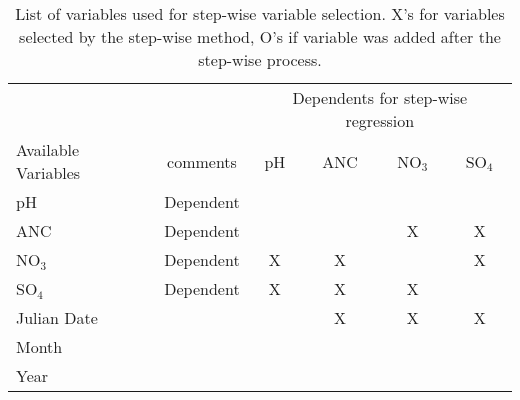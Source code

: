 \begin{table}[htbp]
\caption{List of variables used for step-wise variable selection.  X's for variables selected by the step-wise method, O's if variable was added after the step-wise process.}
\begin{tabular}{lccccc}
\toprule
                                      &                    & \multicolumn{ 4}{c}{Dependents for step-wise regression}                                                                                                                                               \\ \cline{3-6}\noalign{\smallskip}
Available Variables         & comments  & \multicolumn{1}{p{1.2cm}}{pH} &\multicolumn{1}{p{1.2cm}}{ANC} & \multicolumn{1}{p{1.2cm}}{NO$_3$} & \multicolumn{1}{p{1.2cm}}{SO$_4$} \\ 
\midrule
pH                                  & Dependent &                                                     &                                                      &                                                              &  \\ 
ANC                               &Dependent  &                                                     &                                                      & X                                                           & X \\ 
NO$_3$                         &Dependent  & X                                                  & X                                                   &                                                              & X \\ 
SO$_4$                         &Dependent  &X                                                   & X                                                   & X                                                            &  \\ 
Julian Date                    &                   &                                                      &X                                                    &X                                                             & X \\ 
Month                            &                   &                                                      &                                                     &                                                                &  \\ 
Year                               &                   &                                                      &                                                     &                                                                &  \\ 

\end{tabular}
\end{table}
